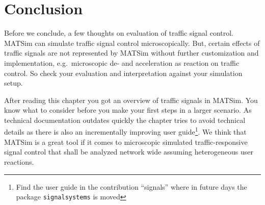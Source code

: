 \section{Conclusion} %
\label{sec:signals_evaluation_conclusion}

Before we conclude, a few thoughts on evaluation of traffic signal control. 
MATSim can simulate traffic signal control microscopically. 
But, certain effects of traffic signals are not represented by MATSim without further customization and implementation, e.g.~microscopic de- and acceleration as reaction on traffic control. 
So check your evaluation and interpretation against your simulation setup. 

After reading this chapter you got an overview of traffic signals in MATSim. 
You know what to consider before you make your first steps in a larger scenario. 
As technical documentation outdates quickly the chapter tries to avoid technical details as there is also an incrementally improving user guide\footnote{Find the user guide  in the contribution ``signals'' where in future days the package \lstinline|signalsystems| is moved}.  
We think that MATSim is a great tool if it comes to microscopic simulated traffic-responsive signal control that shall be analyzed network wide assuming heterogeneous user reactions. 


%
%
%
%
%
%
%
%
%
%


